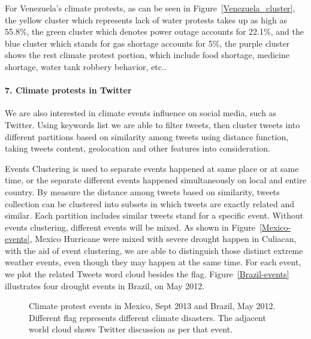 \documentclass[9pt,twocolumn,twoside]{pnas-new}
\begin{document}
For Venezuela's climate protests, as can be seen in Figure~\ref{Venezuela_cluster}, the yellow cluster which represents lack of water protests takes up as high as 55.8\%, the green cluster which denotes power outage accounts for 22.1\%, and the blue cluster which stands for gas shortage accounts for 5\%, the purple cluster shows the rest climate protest portion, which include food shortage, medicine shortage, water tank robbery behavior, etc..


\paragraph{7. Climate protests in Twitter}
We are also interested in climate events influence on social media, such as Twitter. Using keywords list we are able to filter tweets, then cluster tweets into different partitions based on similarity among tweets using distance function, taking tweets content, geolocation and other features into consideration. 

Events Clustering is used to separate events happened at same place or at same time, or the separate different events happened simultaneously on local and entire country. By measure the distance among tweets based on similarity, tweets collection can be clustered into subsets in which tweets are exactly related and similar. Each partition includes similar tweets stand for a specific event. Without events clustering, different events will be mixed. As shown in Figure~\ref{Mexico-events}, Mexico Hurricane were mixed with severe drought happen in Culiacan, with the aid of event clustering, we are able to distinguish those distinct extreme weather events, even though they may happen at the same time. For each event, we plot the related Tweets word cloud besides the flag. Figure~\ref{Brazil-events} illustrates four drought events in Brazil, on May 2012. 

\begin{figure}[t]
	\centering
	\caption{Climate protest events in Mexico, Sept 2013 and Brazil, May 2012. Different flag represents different climate disasters. The adjacent world cloud shows Twitter discussion as per that event. }
\label{Twitter-events}
\end{figure}
\end{document}
